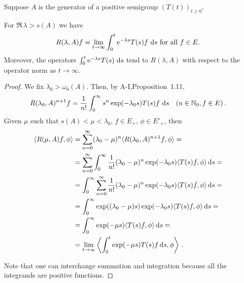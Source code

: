 \begin{theorem}\label{thm:c3-1.2}
	Suppose $A$ is the generator of a positive semigroup $(T(t))_{t\geq 0}$.
	
	For $\Re\,\lambda > s(A)$ we have
	\begin{equation}\label{eq:c3-1.1}
		R(\lambda,A)f = \lim_{t\to\infty} \int_{0}^t \mathrm{e}^{-\lambda s} T(s)f \,\mathop{}\!\mathrm{d}{s} \text{ for all } f \in E.
	\end{equation}
	Moreover, the operators $\int_{0}^t \mathrm{e}^{-\lambda s} T(s) \,\mathop{}\!\mathrm{d}{s}$ tend to $R(\lambda,A)$ with respect to the operator norm as $t \to \infty$.
\end{theorem}
\begin{proof}
	We fix $\lambda_{0} > \omega_0(A)$.
	Then, by A-I,Proposition~1.11,
	\begin{equation}\label{eq:c3-1.2}
		R(\lambda_{0},A)^{n+1}f = \frac{1}{n!} \int_{0}^{\infty} s^n \exp(-\lambda_{0}s) T(s)f \,\mathop{}\!\mathrm{d}{s} \quad (n \in \mathbb{N}_{0}, f \in E)\,.
	\end{equation}
	Given $\mu$ such that $s(A) < \mu < \lambda_{0}$, $f \in E_{+}$, $\phi \in E'_{+}$, then
	\begin{equation}\label{eq:c3-1.3}
	\begin{aligned}
		\langle R(\mu,A)f,\phi\rangle &= \sum_{n=0}^{\infty} (\lambda_{0}-\mu)^n\langle R(\lambda_{0},A)^{n+1}f,\phi\rangle = \\
		&= \sum_{n=0}^{\infty} \int_{0}^{\infty} \frac{1}{n!}(\lambda_{0}-\mu)^n\exp(-\lambda_{0}s)\langle T(s)f,\phi\rangle\mathop{}\!\mathrm{d}{s} = \\
		&= \int_{0}^{\infty} \sum_{n=0}^{\infty} \frac{1}{n!}(\lambda_{0}-\mu)^n\exp(-\lambda_{0}s)\langle T(s)f,\phi\rangle\mathop{}\!\mathrm{d}{s} = \\
		&= \int_{0}^{\infty} \exp((\lambda_{0}-\mu)s)\exp(-\lambda_{0}s)\langle T(s)f,\phi\rangle\mathop{}\!\mathrm{d}{s} = \\
		&= \int_{0}^{\infty} \exp(-\mu s)\langle T(s)f,\phi\rangle\mathop{}\!\mathrm{d}{s} = \\ & = \lim_{t\to\infty}\left\langle \int_{0}^t \exp(-\mu s)T(s)f \mathop{}\!\mathrm{d}{s},\phi\right\rangle\,.
	\end{aligned}
	\end{equation}
	
	Note that one can interchange summation and integration because all the integrands are positive functions.
	

\end{proof}
